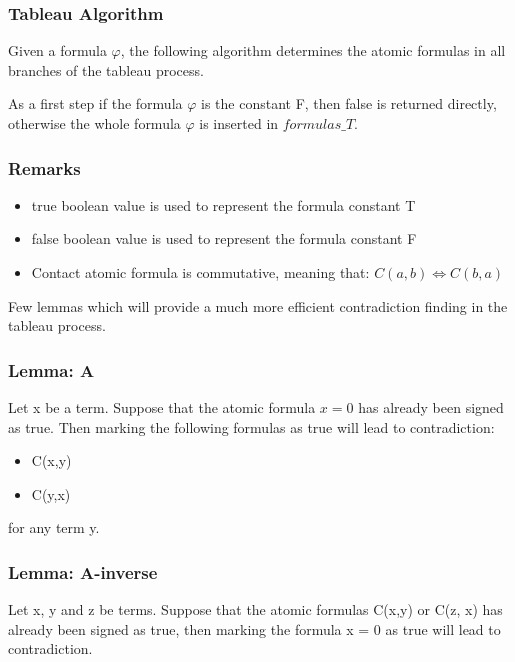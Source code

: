\documentclass{article}
\begin{document}
	\subsubsection*{Tableau Algorithm}
	Given a formula $\varphi$, the following algorithm determines the atomic formulas in all branches of the tableau process.

	As a first step if the formula $\varphi$ is the constant F, then false is returned directly, otherwise the whole formula $\varphi$ is inserted in $formulas\_T$.
	\newline
	\subsubsection*{Remarks}
	\begin{itemize}
		\item true boolean value is used to represent the formula constant T
		\item false boolean value is used to represent the formula constant F
		\item Contact atomic formula is commutative, meaning that: $C(a,b) \iff C(b,a)$
	\end{itemize}

	Few lemmas which will provide a much more efficient contradiction finding in the tableau process.
	\subsubsection*{Lemma: A}
	Let x be a term. Suppose that the atomic formula $x = 0$ has already been signed as true.
	Then marking the following formulas as true will lead to contradiction:
	\begin{itemize}
		\item C(x,y)
		\item C(y,x)
	\end{itemize}
	for any term y.

	\subsubsection*{Lemma: A-inverse}
	Let x, y and z be terms. Suppose that the atomic formulas C(x,y) or C(z, x) has already been signed as true, then marking the formula x = 0 as true will lead to contradiction.
	\newline
\end{document}
